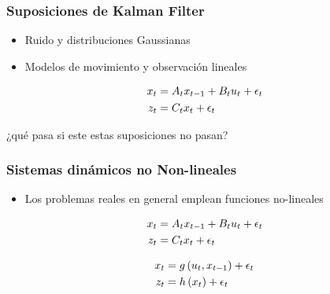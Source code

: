 \begin{frame}
	\frametitle{Suposiciones de Kalman Filter}
	
	\begin{itemize}
		\item Ruido y distribuciones Gaussianas
		\item Modelos de movimiento y observación lineales
	\end{itemize}

	\begin{align*}
		x_{t} &= A_{t} x_{t-1} + B_{t}u_{t} + \epsilon_{t}\\
		z_{t} &= C_{t} x_{t} + \epsilon_{t}
	\end{align*}

	\centering
	\alert{¿qué pasa si este estas suposiciones no pasan?}
\end{frame}

\begin{frame}
	\frametitle{Sistemas dinámicos no Non-lineales}
	\begin{itemize}
		\item Los problemas reales en general emplean funciones no-lineales
	\end{itemize}
	
	\begin{align*}
		x_{t} &= A_{t} x_{t-1} + B_{t}u_{t} + \epsilon_{t}\\
		z_{t} &= C_{t} x_{t} + \epsilon_{t}
	\end{align*}


	\begin{align*}
		x_{t} &= g\left( u_{t}, x_{t-1} \right) + \epsilon_{t}\\
		z_{t} &= h\left( x_{t} \right) + \epsilon_{t}
	\end{align*}

\end{frame}


